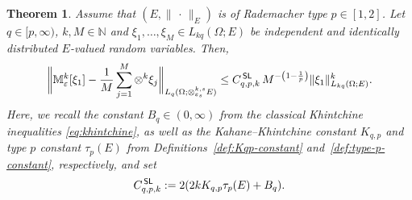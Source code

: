 \documentclass[10pt,a4paper]{amsart}
\newtheorem{theorem}{Theorem}
\newcommand{\CSL}{C^{\,\sf SL}_{q,p,k}}
\newcommand{\Mk}{\bbM^k_\varepsilon}
\newcommand{\bbM}{\mathbb{M}}
\newcommand{\bbN}{\mathbb{N}}
\newcommand{\norm}[2]{     \| #1       \|_{ #2 }}
\newcommand{\xk}{\otimes^k}
\newcommand{\xkseps}{\otimes^{k,s}_{\varepsilon_s}}
\begin{document}
\begin{theorem}\label{thm:MC-k} 
	Assume that  
	$(E,\norm{\,\cdot\,}{E})$ 
	is of Rademacher type $p\in[1,2]$. 
	Let $q\in[p,\infty)$, $k,M\in\bbN$ 
	and $\xi_1,\ldots,\xi_M\in L_{kq}(\Omega;E)$ be 
	independent and identically distributed 
	$E$-valued random variables. 
	Then, 
	\begin{equation}\label{eq:thm:MC-k}  	
		\biggl\| 
		\Mk[\xi_1] 
		-
		\frac{1}{M} 
		\sum_{j=1}^M 
		\xk \xi_j 
		\biggr\|_{L_q(\Omega;\xkseps E)} 
		\leq 
		\CSL \,  
		M^{-\left( 1-\frac{1}{p} \right)} 
		\norm{ \xi_1 }{L_{kq}(\Omega; E)}^k .  
	\end{equation} 
	Here, we recall  
	the constant $B_q\in(0,\infty)$   
	from the classical 
	Khintchine inequalities \eqref{eq:khintchine},  
	as well as the Kahane--Khintchine constant $K_{q,p}$   
	and type $p$ constant $\tau_p(E)$  
	from Definitions~\ref{def:Kqp-constant} and~\ref{def:type-p-constant}, 
	respectively, and set 
	\begin{equation}\label{eq:CSL} 
	\CSL := 2 (2 k  K_{q,p} \tau_p(E) + B_q). 
	\end{equation}
\end{theorem} 
\end{document}
